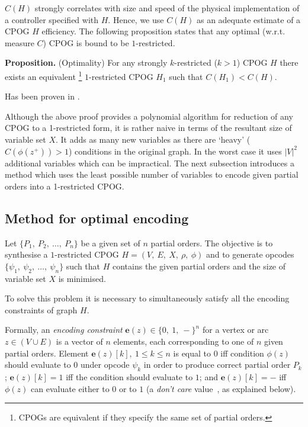 $C(H)$ strongly correlates with size and speed of the physical implementation
of a controller specified with $H$. Hence, we use $C(H)$ as an adequate
estimate of a CPOG $H$ efficiency. The following proposition states
that any optimal (w.r.t. measure $C$) CPOG is bound to be $1$-restricted.

\textbf{Proposition.} (Optimality) For any strongly $k$-restricted
($k>1$) CPOG $H$ there exists an equivalent%
\footnote{CPOGs are equivalent if they specify the same set of partial orders.%
} $1$-restricted CPOG $H_{1}$ such that $C(H_{1})<C(H)$.

Has been proven in \cite{2009_mokhov_phd}.

Although the above proof provides a polynomial algorithm for reduction
of any CPOG to a 1-restricted form, it is rather naive in terms of
the resultant size of variable set $X$. It adds as many new variables
as there are `heavy' ($C(\phi(z^{+}))>1$) conditions in the original
graph. In the worst case it uses $|V|^{2}$ additional variables which
can be impractical. The next subsection introduces a method which
uses the least possible number of variables to encode given partial
orders into a 1-restricted CPOG.


\subsection{Method for optimal encoding\label{sec:Method-for-optimal}
}

Let $\{P_{1},\ P_{2},\ \dots,\ P_{n}\}$ be a given set of $n$ partial
orders. The objective is to synthesise a $1$-restricted CPOG $H=(V,\ E,\ X,\ \rho,\ \phi)$
and to generate opcodes $\{\psi_{1},\ \psi_{2},\ \dots,\ \psi_{n}\}$
such that $H$ contains the given partial orders and the size of variable
set $X$ is minimised.

To solve this problem it is necessary to simultaneously satisfy all
the encoding constraints of graph $H$.

Formally, an \emph{encoding constraint} $\mathbf{e}(z)\in\{0,\ 1,\ -\}^{n}$
for a vertex or arc $z\in(V\cup E)$ is a vector of $n$ elements,
each corresponding to one of $n$ given partial orders. Element $\mathbf{e}(z)[k],\ 1\le k\le n$
is equal to $0$ iff condition $\phi(z)$ should evaluate to $0$
under opcode $\psi_{k}$ in order to produce correct partial order
$P_{k}$; $\mathbf{e}(z)[k]=1$ iff the condition should evaluate
to $1$; and $\mathbf{e}(z)[k]=-$ iff $\phi(z)$ can evaluate either
to $0$ or to $1$ (a \emph{don't care} value~\cite{1994_de_micheli_book},
as explained below).

